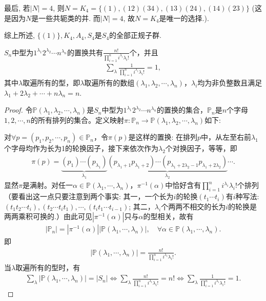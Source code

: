 \documentclass[../../main.tex]{subfiles}%
\begin{document}
\begin{solution}
最后, 若$|N| = 4$, 则$N = K_4 = \{(1), (12)(34), (13)(24), (14)(23)\}$ (这是因为$N$是一些共轭类的并. 而$|N| = 4$, 故$N = K_4$是唯一的选择.).

综上所述, $\{(1)\}, K_4, A_4, S_4$是$S_4$的全部正规子群.

\end{solution}

\begin{proposition}\label{proposition:置换的型相关结论}
$S_n$中型为$1^{\lambda_1}2^{\lambda_2}\cdots n^{\lambda_n}$的置换共有$\frac{n!}{\prod\limits_{i=1}^n i^{\lambda_i}\lambda_i!}$个，并且
\begin{align*}
\sum\limits_{\lambda} \frac{1}{\prod\limits_{i=1}^n i^{\lambda_i}\lambda_i!} = 1,
\end{align*}
其中$\lambda$取遍所有的型，即$\lambda$取遍所有的数组$(\lambda_1,\lambda_2,\cdots,\lambda_n)$，$\lambda_i$均为非负整数且满足$\lambda_1 + 2\lambda_2 + \cdots + n\lambda_n = n$.
\end{proposition}
\begin{proof}

令$\mathbb{P}(\lambda_1,\lambda_2,\cdots,\lambda_n)$是$S_n$中型为$1^{\lambda_1}2^{\lambda_2}\cdots n^{\lambda_n}$的置换的集合，$\mathbb{P}_n$是$n$个字母$1,2,\cdots,n$的所有排列的集合。定义映射$\pi: \mathbb{P}_n \to \mathbb{P}(\lambda_1,\lambda_2,\cdots,\lambda_n)$如下:

对$\forall p=(p_1,p_2,\cdots,p_n)\in\mathbb{P}_n$，令$\pi(p)$是这样的置换: 在排列$p$中，从左至右前$\lambda_1$个字母均作为长为1的轮换因子，接下来依次作为$\lambda_2$个对换因子，等等，即
\begin{align*}
\pi(p) = \underbrace{(p_1)\cdots(p_{\lambda_1})}_{\lambda_1} \underbrace{(p_{\lambda_1+1}p_{\lambda_1+2})\cdots(p_{\lambda_1+2\lambda_2-1}p_{\lambda_1+2\lambda_2})}_{\lambda_2} \cdots.
\end{align*}
显然$\pi$是满射。对任一$\alpha\in\mathbb{P}(\lambda_1,\cdots,\lambda_n)$，$\pi^{-1}(\alpha)$中恰好含有$\prod\limits_{i=1}^n i^{\lambda_i}\lambda_i!$个排列（要看出这一点只要注意到两个事实: 其一，一个长为$i$的轮换$(t_1\cdots t_i)$有$i$种写法: $(t_1t_2\cdots t_i), (t_2\cdots t_it_1), \cdots, (t_it_1\cdots t_{i-1})$; 其二，$\lambda_i$个两两不相交的长为$i$的轮换是两两乘积可换的.）由此可见$|\pi^{-1}(\alpha)|$只与$\alpha$的型相关，故有
\begin{align*}
|\mathbb{P}_n| = |\pi^{-1}(\alpha)| |\mathbb{P}(\lambda_1,\cdots,\lambda_n)|, \quad \forall \alpha\in\mathbb{P}(\lambda_1,\cdots,\lambda_n).
\end{align*}
即
\begin{align*}
|\mathbb{P}(\lambda_1,\cdots,\lambda_n)| = \frac{n!}{\prod\limits_{i=1}^n i^{\lambda_i}\lambda_i!}.
\end{align*}
当$\lambda$取遍所有的型时，有
\begin{align*}
\sum_{\lambda}{|\mathbb{P} (\lambda _1,\cdots ,\lambda _n)|}=|S_n|\Longleftrightarrow \sum_{\lambda}{\frac{n!}{\prod\limits_{i=1}^n{i^{\lambda _i}\lambda _i!}}}=n!\Longleftrightarrow \sum_{\lambda}{\frac{1}{\prod\limits_{i=1}^n{i^{\lambda _i}\lambda _i!}}}=1.
\end{align*}


\end{proof}
\end{document}
